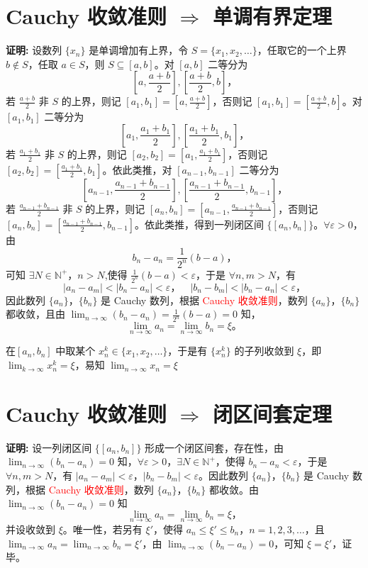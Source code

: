 \documentclass[lang=cn,newtx,10pt,scheme=chinese]{elegantbook}
\begin{document}
\section*{Cauchy 收敛准则 $\Rightarrow$ 单调有界定理}

\textbf{证明:} 设数列 $\{x_n\}$ 是单调增加有上界，令 $S = \{x_1, x_2, \ldots\}$，任取它的一个上界 $b \notin S$，任取 $a \in S$，则 $S \subseteq [a, b]$。对 $[a, b]$ 二等分为
\[
\left[ a, \frac{a + b}{2} \right], \left[ \frac{a + b}{2}, b \right]，
\]
若 $\frac{a + b}{2}$ 非 $S$ 的上界，则记 $[a_1, b_1] = \left[ a, \frac{a + b}{2} \right]$，否则记 $[a_1, b_1] = \left[ \frac{a + b}{2}, b \right]$。对 $[a_1, b_1]$ 二等分为
\[
\left[ a_1, \frac{a_1 + b_1}{2} \right], \left[ \frac{a_1 + b_1}{2}, b_1 \right]，
\]
若 $\frac{a_1 + b_1}{2}$ 非 $S$ 的上界，则记 $[a_2, b_2] = \left[ a_1, \frac{a_1 + b_1}{2} \right]$，否则记 $[a_2, b_2] = \left[ \frac{a_1 + b_1}{2}, b_1 \right]$。依此类推，对 $[a_{n-1}, b_{n-1}]$ 二等分为
\[
\left[ a_{n-1}, \frac{a_{n-1} + b_{n-1}}{2} \right], \left[ \frac{a_{n-1} + b_{n-1}}{2}, b_{n-1} \right]，
\]
若 $\frac{a_{n-1} + b_{n-1}}{2}$ 非 $S$ 的上界，则记 $[a_n, b_n] = \left[ a_{n-1}, \frac{a_{n-1} + b_{n-1}}{2} \right]$，否则记 $[a_n, b_n] = \left[ \frac{a_{n-1} + b_{n-1}}{2}, b_{n-1} \right]$。依此类推，得到一列闭区间 $\{[a_n, b_n]\}$。$\forall \varepsilon > 0$，由
\[
b_n - a_n = \frac{1}{2^n} (b - a)，
\]
可知 $\exists N \in \mathbb{N}^+$，$n>N$,使得 $\frac{1}{2^n} (b - a) < \varepsilon$，于是 $\forall n, m > N$，有
\[
|a_n - a_m| < |b_n - a_n| < \varepsilon， \quad |b_n - b_m| < |b_n - a_n| < \varepsilon，
\]
因此数列 $\{a_n\}$，$\{b_n\}$ 是 Cauchy 数列，根据 \textcolor{red}{Cauchy 收敛准则}，数列 $\{a_n\}$，$\{b_n\}$ 都收敛，且由 $\lim_{n \to \infty} (b_n - a_n) = \frac{1}{2^n} (b - a) = 0$ 知，
\[
\lim_{n \to \infty} a_n = \lim_{n \to \infty} b_n = \xi。
\]

在$[a_n, b_n]$ 中取某个 $x_n^k \in \{x_1, x_2, \ldots\}$，于是有 $\{x_n^k\}$ 的子列收敛到 $\xi$，即 $\lim_{k \to \infty} x_n^k = \xi$，易知 $\lim_{n \to \infty} x_n = \xi$



\section*{Cauchy 收敛准则 $\Rightarrow$ 闭区间套定理}

\textbf{证明:} 设一列闭区间 $\{[a_n, b_n]\}$ 形成一个闭区间套，存在性，由 $\lim_{n \to \infty} (b_n - a_n) = 0$ 知，$\forall \varepsilon > 0$，$\exists N \in \mathbb{N}^+$，使得 $b_n - a_n < \varepsilon$，于是 $\forall n, m > N$，有 $|a_n - a_m| < \varepsilon$，$|b_n - b_m| < \varepsilon$。因此数列 $\{a_n\}$，$\{b_n\}$ 是 Cauchy 数列，根据 \textcolor{red}{Cauchy 收敛准则}，数列 $\{a_n\}$，$\{b_n\}$ 都收敛。由 $\lim_{n \to \infty} (b_n - a_n) = 0$ 知
\[
\lim_{n \to \infty} a_n = \lim_{n \to \infty} b_n = \xi，
\]
并设收敛到 $\xi$。唯一性，若另有 $\xi'$，使得 $a_n \leq \xi' \leq b_n，n = 1, 2, 3, \ldots$，且 $\lim_{n \to \infty} a_n = \lim_{n \to \infty} b_n = \xi'$，由 $\lim_{n \to \infty} (b_n - a_n) = 0$，可知 $\xi = \xi'$，证毕。
\end{document}
